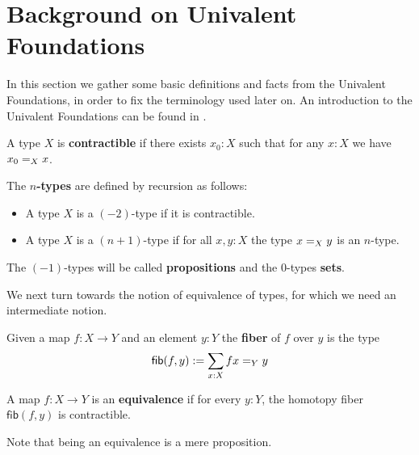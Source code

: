 \newcommand{\Eq}{\mathsf{Eq}}
\newcommand{\fib}[2]{\ensuremath{\mathsf{fib}({#1},{#2})}} %
\newcommand{\iscontr}{\mathsf{isContr}}
\newcommand{\istype}[1]{\mathsf{is}\mbox{-}{#1}\mbox{-}\mathsf{type}}
\newcommand{\idtoeq}{\ensuremath{\mathsf{idtoeq}}}

\section{Background on Univalent Foundations}
\label{sec:background}

In this section we gather some basic definitions and facts from the Univalent Foundations, in order to fix the terminology used
later on. 
An introduction to the Univalent Foundations can be found in \cite{pelayo-warren:univalent-foundations-paper}.

\begin{defn}
 A type $X$ is \textbf{contractible} if there exists $x_0 : X$ such that for any $x : X$ we have $\id[X]{x_0}{x}$.
\end{defn}

\begin{defn}\label{def:hlevel}
The \textbf{$n$-types} are defined by recursion as follows:
\begin{itemize}
 \item A type $X$ is a $(-2)$-type if it is contractible.
 \item A type $X$ is a $(n+1)$-type if for all $x, y : X$ the type $\id[X]x y$ is an $n$-type.
\end{itemize}
\end{defn}

The $(-1)$-types will be called \textbf{propositions} and the $0$-types \textbf{sets}.

We next turn towards the notion of equivalence of types, for which we need an intermediate notion.

\begin{defn}
 Given a map $f \colon X \to Y$ and an element $y : Y$ the \textbf{fiber} of $f$ over $y$ is the type
 \[\fib{f}{y} := \sum_{x : X} \id[Y]{fx}{y}\]
\end{defn}

\begin{defn}
 A map $f \colon X \to Y$ is an \textbf{equivalence} if for every $y : Y$, the homotopy fiber $\fib{f}{y}$ is contractible.
\end{defn}
Note that being an equivalence is a mere proposition.

